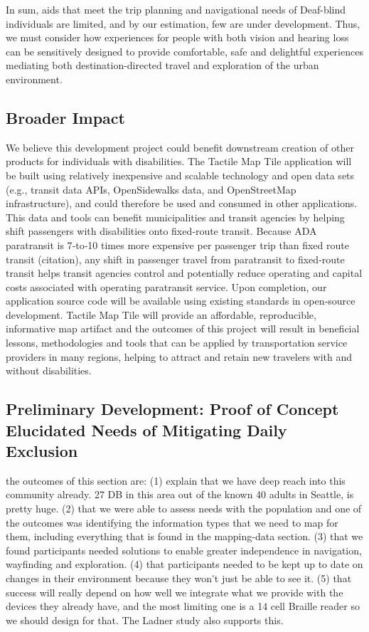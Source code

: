 In sum,  aids that meet the trip planning and navigational needs of Deaf-blind individuals are limited, and by our estimation, few are under development.
Thus, we must consider how experiences for people with both vision and hearing loss can be sensitively designed to provide comfortable, safe and delightful experiences mediating both destination-directed travel and exploration of the urban environment. 



\subsection{Broader Impact}
We believe this development project could benefit downstream creation of other products for individuals with disabilities.
The Tactile Map Tile application will be built using relatively inexpensive and scalable technology and open data sets (e.g., transit data APIs, OpenSidewalks data, and OpenStreetMap infrastructure), and could therefore be used and consumed in other applications. 
This data and tools can benefit municipalities and transit agencies by helping shift passengers with disabilities onto fixed‐route transit. 
Because ADA paratransit is 7‐to‐10 times more expensive per passenger trip than fixed route transit \ac{(citation)}, any shift in passenger travel from paratransit to fixed‐route transit helps transit agencies control and potentially reduce operating and capital costs associated with
operating paratransit service. 
Upon completion, our application source code will be available using existing standards in open‐source development.
Tactile Map Tile will provide an affordable, reproducible, informative map artifact and the outcomes of this project will result in beneficial lessons, methodologies and tools that can be applied by transportation service providers in many regions, helping to attract and retain new travelers with and without disabilities.


\subsection{Preliminary Development: Proof of Concept Elucidated Needs of Mitigating Daily Exclusion}
\label{sec:pilot}

\ac{the outcomes of this section are:
(1) explain that we have deep reach into this community already. 27 DB in this area out of the known 40 adults in Seattle, is pretty huge.
(2) that we were able to assess needs with the population and one of the outcomes was identifying the information types that we need to map for them, including everything that is found in the mapping-data section.
(3) that we found participants needed solutions to enable greater independence in navigation, wayfinding and exploration.
(4) that participants needed to be kept up to date on changes in their environment because they won't just be able to see it.
(5) that success will really depend on how well we integrate what we provide with the devices they already have, and the most limiting one is a 14 cell Braille reader so we should design for that. The Ladner study also supports this.
}


